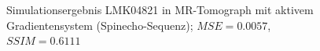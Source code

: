 \begin{figure}[H]
	\centering
	\hfill
	\caption[LMK04821 in MR-Tomograph mit aktivem Gradientensystem (SE) (1)]{Simulationsergebnis LMK04821 in MR-Tomograph mit aktivem Gradientensystem (Spinecho-Sequenz); $MSE=0.0057$, $SSIM=0.6111$}
	\label{fig:resLMKse1}	
\end{figure}

